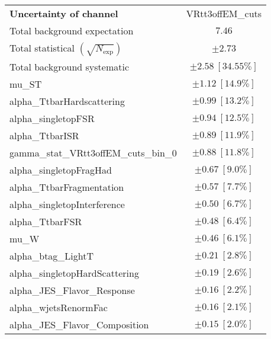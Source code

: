 
\begin{table}
\begin{center}
\setlength{\tabcolsep}{0.0pc}
\begin{tabular*}{\textwidth}{@{\extracolsep{\fill}}lc}
\noalign{\smallskip}\hline\noalign{\smallskip}
{\textbf{Uncertainty of channel}}                                    & VRtt3offEM\_cuts            \\
\noalign{\smallskip}\hline\noalign{\smallskip}
Total background expectation             &  $7.46$       \\
\noalign{\smallskip}\hline\noalign{\smallskip}
Total statistical $(\sqrt{N_{\mathrm{exp}}})$              & $\pm 2.73$       \\
Total background systematic               & $\pm 2.58\ [34.55\%] $             \\
\noalign{\smallskip}\hline\noalign{\smallskip}
\noalign{\smallskip}\hline\noalign{\smallskip}
mu\_ST         & $\pm 1.12\ [14.9\%] $       \\
alpha\_TtbarHardscattering         & $\pm 0.99\ [13.2\%] $       \\
alpha\_singletopFSR         & $\pm 0.94\ [12.5\%] $       \\
alpha\_TtbarISR         & $\pm 0.89\ [11.9\%] $       \\
gamma\_stat\_VRtt3offEM\_cuts\_bin\_0         & $\pm 0.88\ [11.8\%] $       \\
alpha\_singletopFragHad         & $\pm 0.67\ [9.0\%] $       \\
alpha\_TtbarFragmentation         & $\pm 0.57\ [7.7\%] $       \\
alpha\_singletopInterference         & $\pm 0.50\ [6.7\%] $       \\
alpha\_TtbarFSR         & $\pm 0.48\ [6.4\%] $       \\
mu\_W         & $\pm 0.46\ [6.1\%] $       \\
alpha\_btag\_LightT         & $\pm 0.21\ [2.8\%] $       \\
alpha\_singletopHardScattering         & $\pm 0.19\ [2.6\%] $       \\
alpha\_JES\_Flavor\_Response         & $\pm 0.16\ [2.2\%] $       \\
alpha\_wjetsRenormFac         & $\pm 0.16\ [2.1\%] $       \\
alpha\_JES\_Flavor\_Composition         & $\pm 0.15\ [2.0\%] $       \\

\end{tabular*}
\end{center}
\end{table}

